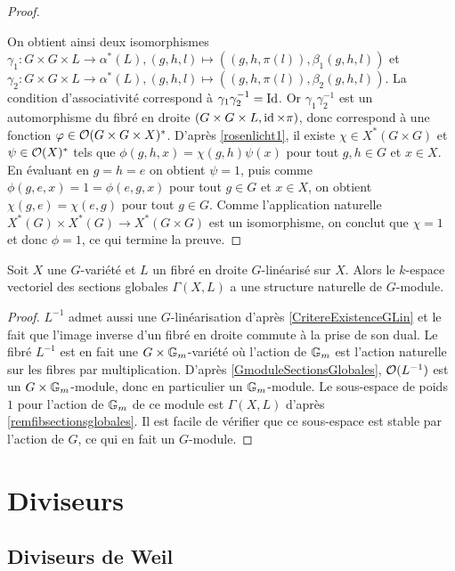 \begin{proof}
\begin{center}
\begin{tikzcd}
	\end{tikzcd}
	\end{center}
	On obtient ainsi deux isomorphismes $\gamma_1:G\times G\times L\rightarrow\alpha^*(L), (g,h,l)\mapsto ((g,h,\pi(l)), \beta_1(g,h,l))$ et $\gamma_2:G\times G\times L\rightarrow\alpha^*(L), (g,h,l)\mapsto ((g,h,\pi(l)), \beta_2(g,h,l))$. La condition d'associativité correspond à $\gamma_1\gamma_2^{-1}=\Id$. Or $\gamma_1\gamma_2^{-1}$ est un automorphisme du fibré en droite $(G\times G\times L,\id\times \pi)$, donc correspond à une fonction $\phi\in \Oo(G\times G\times X)^*$. D'après \ref{rosenlicht1}, il existe $\chi\in X^*(G\times G)$ et $\psi\in\Oo(X)^*$ tels que $\phi(g,h,x)=\chi(g,h)\psi(x)$ pour tout $g,h\in G$ et $x\in X$. En évaluant en $g=h=e$ on obtient $\psi=1$, puis comme $\phi(g,e,x)=1=\phi(e,g,x)$ pour tout $g\in G$ et $x\in X$, on obtient $\chi(g,e)=\chi(e,g)$ pour tout $g\in G$. Comme l'application naturelle $X^*(G)\times X^*(G)\rightarrow X^*(G\times G)$ est un isomorphisme, on conclut que $\chi=1$ et donc $\phi=1$, ce qui termine la preuve.
\end{proof}

\begin{prop}\label{GmoduleSectionsGlobalesGlin}
Soit $X$ une $G$-variété et $L$ un fibré en droite $G$-linéarisé sur $X$. Alors le $k$-espace vectoriel des sections globales $\Gamma(X, L)$ a une structure naturelle de $G$-module.
\end{prop}
\begin{proof}
$L^{-1}$ admet aussi une $G$-linéarisation d'après \ref{CritereExistenceGLin} et le fait que l'image inverse d'un fibré en droite commute à la prise de son dual. Le fibré $L^{-1}$ est en fait une $G\times \GG_m$-variété où l'action de $\GG_m$ est l'action naturelle sur les fibres par multiplication. D'après \ref{GmoduleSectionsGlobales}, $\Oo(L^{-1})$ est un $G\times \GG_m$-module, donc en particulier un $\GG_m$-module. Le sous-espace de poids $1$ pour l'action de $\GG_m$ de ce module est $\Gamma(X, L)$ d'après \ref{remfibsectionsglobales}. Il est facile de vérifier que ce sous-espace est stable par l'action de $G$, ce qui en fait un $G$-module.
\end{proof}

\section{Diviseurs}

\subsection{Diviseurs de Weil}

